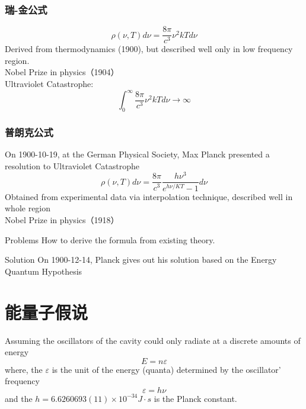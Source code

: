 \begin{frame}[t]
    \frametitle{瑞-金公式}
    \begin{equation*}
        \rho(\nu, T) d \nu=\frac{8 \pi}{c^{3}} \nu^{2} k T d \nu 
    \end{equation*}
    Derived from thermodynamics (1900), but described well only in low frequency region.\\ 
   {\color{deepred} Nobel Prize in physics（1904）}\\ \vspace{0.3em}
   {\color{deepblue} \bullet Ultraviolet Catastrophe:} 
    \begin{equation*}
         \int_0 ^\infty \frac{8 \pi}{c^{3}} \nu^{2} k T d \nu \to \infty 
    \end{equation*}
\end{frame}

\begin{frame}
    \frametitle{普朗克公式}
    On 1900-10-19, at the German Physical Society, 
    Max Planck presented a resolution to {\color{deepblue} Ultraviolet Catastrophe} 
    \begin{equation}
        \boxed{\rho(\nu, T) d \nu=\frac{8 \pi}{c^{3}} \frac{h \nu^{3}}{e^{h \nu / K T}-1} d \nu}
    \end{equation}
    Obtained from experimental data via interpolation technique, described well in whole region \\
    {\color{deepred} Nobel Prize in physics（1918）}\\
\end{frame}

\begin{frame}[t]
    \begin{tcolorbox1}{Problems}
        How to derive the formula from existing theory.
    \end{tcolorbox1}
    \begin{tcolorbox2}{Solution}
        On 1900-12-14, Planck gives out his solution based on the Energy Quantum Hypothesis  
    \end{tcolorbox2}
\end{frame}

\section{能量子假说}
\begin{frame}
    \begin{tcolorbox4}
    Assuming the oscillators of the cavity could only radiate at a discrete amounts of energy
    \begin{equation}
        E=n\varepsilon
    \end{equation}
    where, the $\varepsilon$ is the unit of the energy (quanta) determined by the oscillator' frequency 
    \begin{equation}
        \varepsilon=h\nu
    \end{equation}
    and the $h=6.6260693(11)\times10^{-34} J\cdot s $ is the Planck constant. 
    \end{tcolorbox4}
\end{frame}

